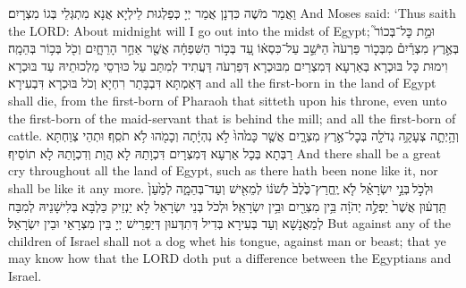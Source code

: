 {{{}}
{וַאֲמַר מֹשֶׁה כִּדְנָן אֲמַר יְיָ כְּפַלְגוּת לֵילְיָא אֲנָא מִתְגְּלֵי בְּגוֹ מִצְרָיִם׃}
{And Moses said: ‘Thus saith the LORD: About midnight will I go out into the midst of Egypt;}{}
{וּמֵ֣ת כׇּל־בְּכוֹר֮ בְּאֶ֣רֶץ מִצְרַ֒יִם֒ מִבְּכ֤וֹר פַּרְעֹה֙ הַיֹּשֵׁ֣ב עַל־כִּסְא֔וֹ עַ֚ד בְּכ֣וֹר הַשִּׁפְחָ֔ה אֲשֶׁ֖ר אַחַ֣ר הָרֵחָ֑יִם וְכֹ֖ל בְּכ֥וֹר בְּהֵמָֽה׃
}
{וִימוּת כָּל בּוּכְרָא בְּאַרְעָא דְּמִצְרַיִם מִבּוּכְרָא דְּפַרְעֹה דַּעֲתִיד לְמִתַּב עַל כּוּרְסֵי מַלְכוּתֵיהּ עַד בּוּכְרָא דְּאַמְתָּא דִּבְבָּתַר רִחְיָא וְכֹל בּוּכְרָא דִּבְעִירָא׃}
{and all the first-born in the land of Egypt shall die, from the first-born of Pharaoh that sitteth upon his throne, even unto the first-born of the maid-servant that is behind the mill; and all the first-born of cattle.}{}
{וְהָ֥יְתָ֛ה צְעָקָ֥ה גְדֹלָ֖ה בְּכׇל־אֶ֣רֶץ מִצְרָ֑יִם אֲשֶׁ֤ר כָּמֹ֙הוּ֙ לֹ֣א נִהְיָ֔תָה וְכָמֹ֖הוּ לֹ֥א תֹסִֽף׃}
{וּתְהֵי צְוַחְתָּא רַבְּתָא בְּכָל אַרְעָא דְּמִצְרָיִם דִּכְוָתַהּ לָא הֲוָת וְדִכְוָתַהּ לָא תוֹסֵיף׃}
{And there shall be a great cry throughout all the land of Egypt, such as there hath been none like it, nor shall be like it any more.}{}
{וּלְכֹ֣ל \legarmeh  בְּנֵ֣י יִשְׂרָאֵ֗ל לֹ֤א יֶֽחֱרַץ־כֶּ֙לֶב֙ לְשֹׁנ֔וֹ לְמֵאִ֖ישׁ וְעַד־בְּהֵמָ֑ה לְמַ֙עַן֙ תֵּֽדְע֔וּן אֲשֶׁר֙ יַפְלֶ֣ה יְהֹוָ֔ה בֵּ֥ין מִצְרַ֖יִם וּבֵ֥ין יִשְׂרָאֵֽל׃
}
{וּלְכֹל בְּנֵי יִשְׂרָאֵל לָא יַנְזֵיק כַּלְבָּא בְּלִישָׁנֵיהּ לְמִבַּח לְמֵאֲנָשָׁא וְעַד בְּעִירָא בְּדִיל דְּתִדְּעוּן דְּיַפְרֵישׁ יְיָ בֵּין מִצְרָאֵי וּבֵין יִשְׂרָאֵל׃}
{But against any of the children of Israel shall not a dog whet his tongue, against man or beast; that ye may know how that the LORD doth put a difference between the Egyptians and Israel.}{}
}
